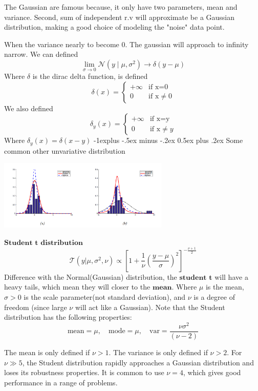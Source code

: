 \documentclass[10pt,landscape]{article}
\makeatletter
\newcommand{\N}{\mathcal{N}}
\newcommand{\variance}{\sigma^2}
\renewcommand{\subsection}{\@startsection{subsection}{2}{0mm}%
                                {-1explus -.5ex minus -.2ex}%
                                {0.5ex plus .2ex}%
                                {\normalfont\normalsize\bfseries}}
\makeatother
\begin{document}
\begin{multicols*}{3}
The Gaussian are famous because, it only have two parameters, mean and variance. Second, sum of independent r.v will approximate be a Gaussian distribution, making a good choice of modeling the "noise" data point.

When the variance nearly to become 0. The gaussian will  approach to infinity narrow. We can defined
\[
\lim_{\sigma\rightarrow0}\N(y\mid\mu,\variance)\rightarrow\delta(y-\mu)
\]
Where $\delta$ is the dirac delta function, is defined
\[
    \delta(x) = 
    \begin{cases}
        +\infty & \text{if x=0} \\
        0  & \text{if x}  \neq 0
    \end{cases}
\]
We also defined
\[
    \delta_y(x) = 
    \begin{cases}
        +\infty & \text{if x=y} \\
        0  & \text{if x}  \neq y
    \end{cases}
\]
Where $\delta_y(x) = \delta(x-y)$
\subsection{Some common other unvariative distribution}

\begin{minipage}{\linewidth}
    \centering
    \includegraphics[width=3.2in]{figures/common-uni-distribution.PNG}
\end{minipage}
$\textbf{Student t distribution}$
\[
\mathcal{T}(y | \mu, \sigma^2, \nu) \propto 
\left[ 1 + \frac{1}{\nu} \left( \frac{y - \mu}{\sigma} \right)^2 \right]^{-\frac{\nu + 1}{2}}
\]
Difference with the Normal(Gaussian) distribution, the $\textbf{student t}$ will have a heavy tails, which mean they will closer to the $\textbf{mean}$. Where $\mu$ is the mean, $\sigma > 0$ is the scale parameter(not standard deviation), and $\nu$ is a degree of freedom (since large $\nu$ will act like a Gaussian). Note that the Student distribution has the following properties:
\[
\text{mean} = \mu, \quad \text{mode} = \mu, \quad \text{var} = \frac{\nu \sigma^2}{(\nu - 2)}
\]

The mean is only defined if $\nu > 1$. The variance is only defined if $\nu > 2$. For $\nu \gg 5$, the Student distribution rapidly approaches a Gaussian distribution and loses its robustness properties. It is common to use $\nu = 4$, which gives good performance in a range of problems.


\end{multicols*}
\end{document}
